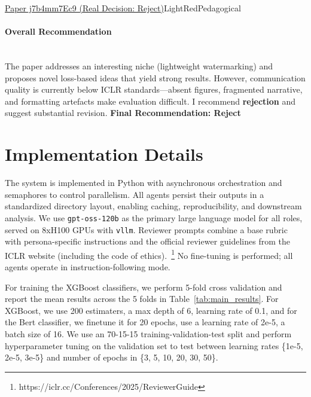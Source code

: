 \documentclass{article} %
\begin{document}
\begin{reviewbox}{\href{https://openreview.net/forum?id=j7b4mm7Ec9}{Paper j7b4mm7Ec9 (Real Decision: Reject)}}{LightRed}{Pedagogical}
\paragraph{Overall Recommendation}\leavevmode\\[0.1em]
The paper addresses an interesting niche (lightweight watermarking) and proposes novel loss-based ideas that yield strong results. However, communication quality is currently below ICLR standards—absent figures, fragmented narrative, and formatting artefacts make evaluation difficult. I recommend \textbf{rejection} and suggest substantial revision.
\textbf{Final Recommendation: Reject}
\end{reviewbox}

\section{Implementation Details}
\label{app:implementation}
The system is implemented in Python with asynchronous orchestration and semaphores to control parallelism. All agents persist their outputs in a standardized directory layout, enabling caching, reproducibility, and downstream analysis. We use \texttt{gpt-oss-120b} as the primary large language model for all roles, served on 8xH100 GPUs with \texttt{vllm}. Reviewer prompts combine a base rubric with persona-specific instructions and the official reviewer guidelines from the ICLR website (including the code of ethics).~\footnote{https://iclr.cc/Conferences/2025/ReviewerGuide} No fine-tuning is performed; all agents operate in instruction-following mode.

For training the XGBoost classifiers, we perform 5-fold cross validation and report the mean results across the 5 folds in Table~\ref{tab:main_results}.
For XGBoost, we use 200 estimaters, a max depth of 6, learning rate of 0.1, and for the Bert classifier, we finetune it for 20 epochs, use a learning rate of 2e-5, a batch size of 16. We use an 70-15-15 training-validation-test split and perform hyperparameter tuning on the validation set to test between learning rates \{1e-5, 2e-5, 3e-5\} and number of epochs in \{3, 5, 10, 20, 30, 50\}.
\end{document}
